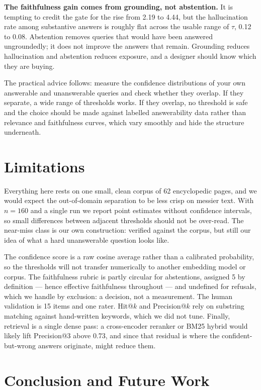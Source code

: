\documentclass[conference]{IEEEtran}
\begin{document}
\textbf{The faithfulness gain comes from grounding, not abstention.} It is tempting to credit the gate for the rise from 2.19 to 4.44, but the hallucination rate among substantive answers is roughly flat across the usable range of $\tau$, 0.12 to 0.08. Abstention removes queries that would have been answered ungroundedly; it does not improve the answers that remain. Grounding reduces hallucination and abstention reduces exposure, and a designer should know which they are buying.

The practical advice follows: measure the confidence distributions of your own answerable and unanswerable queries and check whether they overlap. If they separate, a wide range of thresholds works. If they overlap, no threshold is safe and the choice should be made against labelled answerability data rather than relevance and faithfulness curves, which vary smoothly and hide the structure underneath.

\section{Limitations}
\label{sec:limitations}

Everything here rests on one small, clean corpus of 62 encyclopedic pages, and we would expect the out-of-domain separation to be less crisp on messier text. With $n = 160$ and a single run we report point estimates without confidence intervals, so small differences between adjacent thresholds should not be over-read. The near-miss class is our own construction: verified against the corpus, but still our idea of what a hard unanswerable question looks like.

The confidence score is a raw cosine average rather than a calibrated probability, so the thresholds will not transfer numerically to another embedding model or corpus. The faithfulness rubric is partly circular for abstentions, assigned 5 by definition --- hence effective faithfulness throughout --- and undefined for refusals, which we handle by exclusion: a decision, not a measurement. The human validation is 15 items and one rater. Hit@$k$ and Precision@$k$ rely on substring matching against hand-written keywords, which we did not tune. Finally, retrieval is a single dense pass: a cross-encoder reranker \cite{nogueira2019passage} or BM25 hybrid \cite{robertson2009bm25} would likely lift Precision@3 above 0.73, and since that residual is where the confident-but-wrong answers originate, might reduce them.

\section{Conclusion and Future Work}
\end{document}
